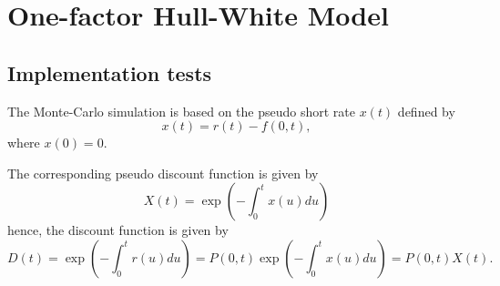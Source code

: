 \chapter{One-factor Hull-White Model}

\section{Implementation tests}

The Monte-Carlo simulation is based on the pseudo short rate $x(t)$ defined by
\begin{equation}
x(t) = r(t) - f(0,t),
\end{equation}
where $x(0) = 0$.

The corresponding pseudo discount function is given by
\begin{equation}
X(t) = \exp \left( - \int_0^t x(u) du \right)
\end{equation}
hence, the discount function is given by
\begin{equation}
D(t) = \exp \left( - \int_0^t r(u) du \right) = P(0,t) \exp \left( - \int_0^t x(u) du \right) = P(0,t) X(t).
\end{equation}


